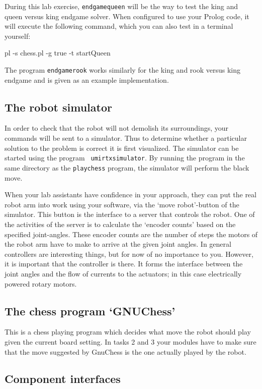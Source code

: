 \documentclass[10pt]{scrartcl}
\begin{document}
During this lab exercise, {\tt endgamequeen} will be the way to test the
king and queen versus king endgame solver. When configured to use your Prolog
code, it will execute the following command, which you can also test in a
terminal yourself:
\begin{verbatimtab}
pl -s chess.pl -g true -t startQueen
\end{verbatimtab}
The program {\tt endgamerook} works similarly for the king and rook versus king 
endgame and is given as an example implementation.

\subsection{The robot simulator}

In order to check that the robot will not demolish its surroundings,
your commands will be sent to a simulator. Thus to determine
whether a particular solution to the problem is correct it is first
visualized. The simulator can be started using the program {\tt
umirtxsimulator}. By running the program in the same directory as the
{\tt playchess} program, the simulator will perform the black move.

When your lab assistants have confidence in your approach, they can put
the real robot arm into work using your software, via the `move
robot'-button of the simulator.
This button is the interface to a server that controls the robot. One
of the activities of the server is to calculate the `encoder counts'
based on the specified joint-angles. These encoder counts are the number
of steps the motors of the robot arm have to make to arrive at the given
joint angles. In general controllers are interesting things, but for now
of no importance to you. However, it is important that the controller is
there. It forms the interface between the joint angles and the flow of
currents to the actuators; in this case electrically powered rotary
motors.

\subsection{The chess program `GNUChess'}

This is a chess playing program which decides what move the robot should
play given the current board setting. In tasks 2 and 3 your modules have
to make sure that the move suggested by GnuChess is the one actually
played by the robot.

\subsection{Component interfaces}
\end{document}
